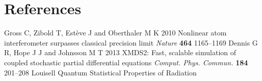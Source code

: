 \documentclass{iopart}
\begin{document}
\section*{References}
\begin{thebibliography}{10}
 Gross C, Zibold T, Est{\`{e}}ve J and Oberthaler M K 2010 Nonlinear atom interferometer surpasses classical
precision limit {\it Nature} {\bf 464} 1165--1169
 Dennis G R, Hope J J and Johnsson M T 2013 XMDS2: Fast, scalable simulation of coupled stochastic partial
differential equations {\it Comput. Phys. Commun.} {\bf 184} 201--208
 Louisell Quantum Statistical Properties of Radiation
\end{thebibliography}
\end{document}
